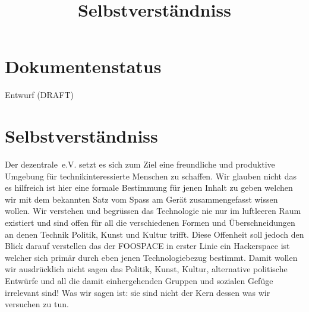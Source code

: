 \documentclass[10pt,a4paper]{article}
\newcommand{\qs}[1]{\glqq#1\grqq}
\newcommand{\name}{dezentrale}
\newcommand{\documentstatus}{Entwurf (DRAFT)}
\begin{document}
\title{Selbstverst{\"a}ndniss}

\section*{Dokumentenstatus}
\documentstatus

\section*{Selbstverst{\"a}ndniss}

Der \name\ e.V. setzt es sich zum Ziel eine freundliche und produktive Umgebung
f{\"u}r technikinteressierte Menschen zu schaffen.  Wir glauben nicht das es
hilfreich ist hier eine formale Bestimmung f{\"u}r jenen Inhalt zu geben welchen
wir mit dem bekannten Satz vom \qs{Spass am Ger{\"a}t} zusammengefasst wissen wollen.
Wir verstehen und begr{\"u}ssen das Technologie nie nur im luftleeren Raum
existiert und sind offen f{\"u}r all die verschiedenen Formen und {\"U}berschneidungen
an denen Technik Politik, Kunst und Kultur trifft.
Diese Offenheit soll jedoch den Blick darauf verstellen das der FOOSPACE in
erster Linie ein \qs{Hackerspace} ist welcher sich prim{\"a}r durch eben
jenen Technologiebezug bestimmt.  Damit wollen wir ausdr{\"u}cklich nicht sagen das
Politik, Kunst, Kultur, alternative politische Entw{\"u}rfe und all die damit
einhergehenden Gruppen und sozialen Gef{\"u}ge irrelevant sind! Was wir sagen ist:
sie sind nicht der Kern dessen was wir versuchen zu tun.
\end{document}
